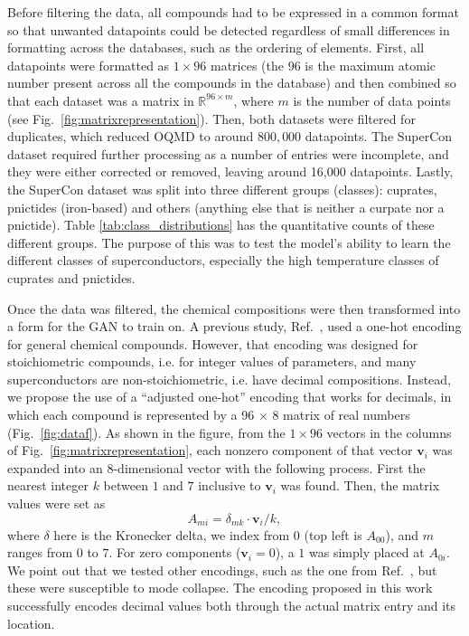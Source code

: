 Before filtering the data, all compounds had to be expressed in a common format so that unwanted datapoints could be detected regardless of small differences in formatting across the databases, such as the ordering of elements. First, all datapoints were formatted as $1 \times 96$ matrices
\cite{ROTER20201353689} (the $96$ is the maximum atomic number present across all the compounds in the database) and then combined so that each dataset was a matrix in $\mathbb{R}^{96 \times m}$, where $m$ is the number of data points (see Fig.~\ref{fig:matrixrepresentation}). Then, both datasets were filtered for duplicates, which reduced OQMD to around $800,000$ datapoints. The SuperCon dataset required further processing as a number of entries were incomplete, and they were either corrected or removed, leaving around 16,000 datapoints. Lastly, the SuperCon dataset was split into three different groups (classes): cuprates, pnictides (iron-based) and others (anything else that is neither a curpate nor a pnictide). Table \ref{tab:class_distributions} has the quantitative counts of these different groups. The purpose of this was to test the model's ability to learn the different classes of superconductors, especially the high temperature classes of cuprates and pnictides. 

Once the data was filtered, the chemical compositions were then transformed into a form for the GAN to train on. A previous study, Ref.~\cite{Dan2020}, used a one-hot encoding for general chemical compounds. However, that encoding was designed for stoichiometric compounds, i.e. for integer values of parameters, 
and many superconductors are non-stoichiometric, i.e. have decimal compositions. Instead, we propose the use of a ``adjusted one-hot'' encoding that works for decimals,
in which each compound is represented by a 96 $\times$ 8 matrix of real numbers (Fig.~\ref{fig:dataf}). As shown in the figure, from the $1 \times 96$ vectors in the columns of 
Fig.~\ref{fig:matrixrepresentation}, each nonzero component of that vector $\mathbf{v}_i$ was expanded into an 8-dimensional vector with the following process. First the nearest integer $k$ between $1$ and $7$ inclusive to $\mathbf{v}_i$ was found. Then, the matrix values were set as 
\begin{equation}
    A_{mi} = \delta_{mk} \cdot \mathbf{v}_i/k,
\end{equation}
where $\delta$ here is the Kronecker delta, we index from $0$ (top left is $A_{00}$), and $m$ ranges from $0$ to $7$. For zero components ($\mathbf{v}_i = 0$), a $1$ was simply placed at $A_{0i}$. We point out that we tested other encodings, such as the one from Ref.~\cite{PhysRevB.103.014509}, but these were susceptible to mode collapse. The encoding proposed in this work successfully encodes decimal values both through the actual matrix entry and its location.


